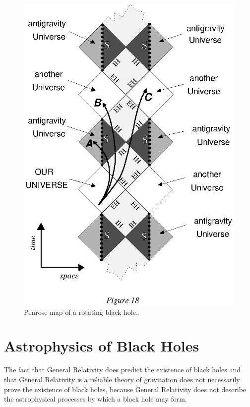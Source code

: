 \documentclass{lamuphys}
\begin{document}
\begin{figure}[tb]
  \begin{center}
    \leavevmode
    \includegraphics{kerr.ps}
    \caption{Penrose map of a rotating black hole.}
  \end{center}
\end{figure}

\section{Astrophysics of Black Holes}

The fact that General Relativity does predict the existence of black holes and that
General Relativity is a reliable theory of gravitation does not necessarily prove the
existence of black holes, because General Relativity does not describe the
astrophysical processes by which a black hole may form.
\end{document}
